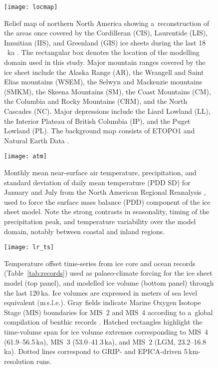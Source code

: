 \documentclass[tc, manuscript]{copernicus}
\begin{document}
\begin{figure}%
\texttt{[image: locmap]}
\caption{%
      Relief map of northern North America showing a~reconstruction of the
      areas once covered by the Cordilleran (CIS), Laurentide (LIS),
      Innuitian (IIS), and Greenland (GIS) ice sheets during the last
      18\,\unit{\,ka} \citep[21.4\,cal\,ka,][]{Dyke.2004}. The
      rectangular box denotes the location of the modelling domain used in
      this study. Major mountain ranges covered by the ice sheet include the
      Alaska Range (AR), the Wrangell and Saint Elias mountains (WSEM), the
      Selwyn and Mackenzie mountains (SMKM), the Skeena Mountains (SM), the
      Coast Mountains (CM), the Columbia and Rocky Mountains (CRM), and the
      North Cascades (NC). Major depressions include the Liard Lowland (LL),
      the Interior Plateau of British Columbia (IP), and the Puget Lowland
      (PL). The background map consists of ETOPO1 \citep{Amante.Eakins.2009}
      and Natural Earth Data \citep{Patterson.Kelso.2015}.}
\label{fig:locmap}%
\end{figure}%


\begin{figure}%
\texttt{[image: atm]}
\caption{%
      Monthly mean near-surface air temperature, precipitation, and standard
      deviation of daily mean temperature (PDD SD) for January and July from
      the North American Regional Reanalysis
      \citep[NARR;][]{Mesinger.etal.2006}, used to force the surface mass
      balance (PDD) component of the ice sheet model. Note the strong
      contrasts in seasonality, timing of the precipitation peak, and
      temperature variability over the model domain, notably between coastal
      and inland regions.}
\label{fig:atm}%
\end{figure}%


\begin{figure}%
\texttt{[image: lr\_ts]}
\caption{%
      Temperature offset time-series from ice core and ocean records
      (Table~\ref{tab:records}) used as palaeo-climate forcing for the ice
      sheet model (top panel), and modelled ice volume (bottom panel)
      through the last 120\,\unit{ka}. Ice volumes are expressed in meters
      of sea level equivalent (m\,s.l.e.). Gray fields indicate Marine
      Oxygen Isotope Stage (MIS) boundaries for MIS~2 and MIS~4 according to
      a~global compilation of benthic  records
      \citep{Lisiecki.Raymo.2005}. Hatched rectangles highlight the
      time-volume span for ice volume extremes corresponding to MIS~4
      (61.9--56.5\,\unit{ka}), MIS~3 (53.0--41.3\,\unit{ka}), and MIS~2
      (LGM, 23.2--16.8\,\unit{ka}). Dotted lines correspond to GRIP- and
      EPICA-driven 5\,\unit{km}-resolution runs.}
\label{fig:lr_ts}%
\end{figure}%
\end{document}
